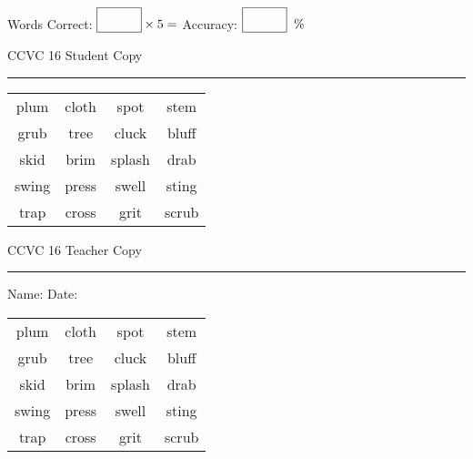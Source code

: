 \documentclass{memoir}
\begin{document}
\normalsize

Words Correct: $\fbox{\phantom{\huge 100}} \times 5 = $ Accuracy: $\fbox{\phantom{\huge 100}}\;\; \%$ 

\vfill

\newpage


\footnotesize \noindent
CCVC 16 \hfill Student Copy
\smallskip
\hrule

\Large

\setlength{\tabcolsep}{14pt}
\def\arraystretch{3}

{\selectfont


\begin{vplace}[0.5]
\begin{center}
\begin{tabular}{cccc}
plum & cloth & spot & stem \\
grub & tree & cluck & bluff \\
skid & brim      & splash & drab             \\
swing & press       & swell & sting \\
trap & cross & grit      & scrub \\
\end{tabular}
\end{center}
\end{vplace}

}

\newpage

\footnotesize \noindent
CCVC 16 \hfill Teacher Copy
\smallskip
\hrule

\normalsize

\vfill

\noindent
Name: \underline{\hspace{1.75in}} \hfill Date: \underline{\hspace{1in}}

\Large

{\selectfont


\begin{vplace}[0.5]
\begin{center}
\begin{tabular}{cccc}
plum & cloth & spot & stem \\
grub & tree & cluck & bluff \\
skid & brim      & splash & drab             \\
swing & press       & swell & sting \\
trap & cross & grit      & scrub \\
\end{tabular}
\end{center}
\end{vplace}



}
\end{document}
